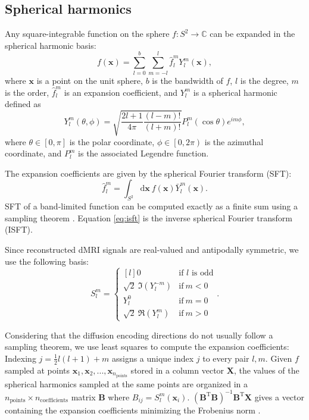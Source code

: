 \documentclass[10pt, letterpaper, oneside]{article}
\begin{document}
\subsection{Spherical harmonics}

Any square-integrable function on the sphere $f: S^2 \rightarrow \mathbb{C}$ can be expanded in the spherical harmonic basis:
\begin{equation}\label{eq:isft}
f(\mathbf{x}) = \sum_{l=0}^b \sum_{m=-l}^l \hat{f}_l^m Y_l^m(\mathbf{x}) ,
\end{equation}
where $\mathbf{x}$ is a point on the unit sphere, $b$ is the bandwidth of $f$, $l$ is the degree, $m$ is the order, $\hat{f}_l^m$ is an expansion coefficient, and $Y_l^m$ is a spherical harmonic defined as
\begin{equation}
Y_l^m(\theta, \phi) = \sqrt{\frac{2l+1}{4\pi}\frac{(l-m)!}{(l+m)!}} P_l^m(\cos \theta) e^{im\phi} ,
\end{equation}
where $\theta \in \left[ 0, \pi \right]$ is the polar coordinate, $\phi \in \left[0, 2 \pi \right)$ is the azimuthal coordinate, and $P_l^m$ is the associated Legendre function.

The expansion coefficients are given by the spherical Fourier transform (SFT):
\begin{equation}\label{eq:sft}
\hat{f}_l^m = \int_{S^2} \text{d}\mathbf{x} \ f(\mathbf{x}) \bar{Y}_l^m(\mathbf{x}) .
\end{equation}
SFT of a band-limited function can be computed exactly as a finite sum using a sampling theorem \citep{driscoll1994computing}. Equation \ref{eq:isft} is the inverse spherical Fourier transform (ISFT).

Since reconstructed dMRI signals are real-valued and antipodally symmetric, we use the following basis:
\begin{equation}\label{eq:basis}
S_l^m = \left\{\begin{matrix*}[l]
0 & \text{if } l \text{ is odd} \\
\sqrt{2} \ \Im \left( Y_l^{-m} \right) & \text{if} \ m < 0 \\ 
Y_l^0 & \text{if} \ m = 0 \\
\sqrt{2} \ \Re \left( Y_l^{m} \right) & \text{if} \ m > 0 
\end{matrix*}\right . .
\end{equation}

Considering that the diffusion encoding directions do not usually follow a sampling theorem, we use least squares to compute the expansion coefficients: Indexing $j = \frac{1}{2}l(l + 1) + m$ assigns a unique index $j$ to every pair $l, m$. Given $f$ sampled at points $\mathbf{x}_1, \mathbf{x}_2, ..., \mathbf{x}_{n_\text{points}}$ stored in a column vector $\mathbf{X}$, the values of the spherical harmonics sampled at the same points are organized in a $n_\text{points} \times n_\text{coefficients}$ matrix $\mathbf{B}$ where $B_{ij} = S_l^m(\mathbf{x}_i)$. $\left( \mathbf{B}^{\text{T}}\mathbf{B} \right)^{-1} \mathbf{B}^{\text{T}} \mathbf{X}$ gives a vector containing the expansion coefficients minimizing the Frobenius norm \citep{brechbuhler1995parametrization}.
\end{document}
